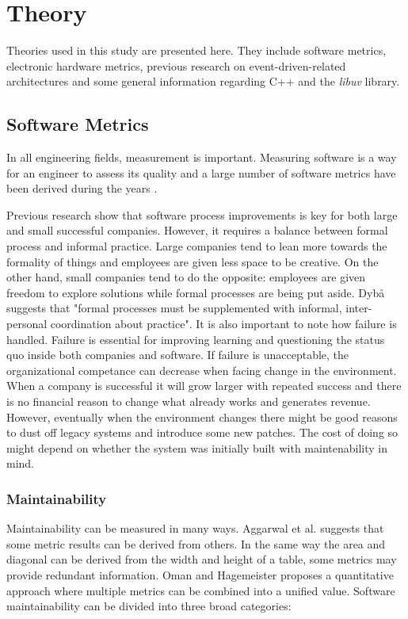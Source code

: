\chapter{Theory}
\label{cha:theory}

Theories used in this study are presented here. They include software metrics,
electronic hardware metrics, previous research on event-driven-related
architectures and some general information regarding C++ and the \textit{libuv}
library.

\section{Software Metrics}

In all engineering fields, measurement is important. Measuring software is a
way for an engineer to assess its quality and a large number of software
metrics have been derived during the years \cite{aggarwal2006empirical}.


Previous research show that software process improvements is key for both large
and small successful companies. However, it requires a balance between formal
process and informal practice. Large companies tend to lean more towards the
formality of things and employees are given less space to be creative. On the
other hand, small companies tend to do the opposite: employees are given
freedom to explore solutions while formal processes are being put aside. Dybå
\cite{dybaa2003factors} suggests that "formal processes must be supplemented
with informal, inter-personal coordination about practice". It is also
important to note how failure is handled. Failure is essential for improving
learning and questioning the status quo inside both companies and software. If
failure is unacceptable, the organizational competance can decrease when facing
change in the environment. When a company is successful it will grow larger
with repeated success and there is no financial reason to change what already
works and generates revenue. However, eventually when the environment changes
there might be good reasons to dust off legacy systems and introduce some new
patches. The cost of doing so might depend on whether the system was initially
built with maintenability in mind. \cite{dybaa2003factors}

\subsection{Maintainability}

Maintainability can be measured in many ways. Aggarwal et al.
\cite{aggarwal2006empirical} suggests that some metric results can be derived
from others. In the same way the area and diagonal can be derived from the
width and height of a table, some metrics may provide redundant information.
Oman and Hagemeister \cite{oman1992metrics} proposes a quantitative approach
where multiple metrics can be combined into a unified value. Software
maintainability can be divided into three broad categories:

